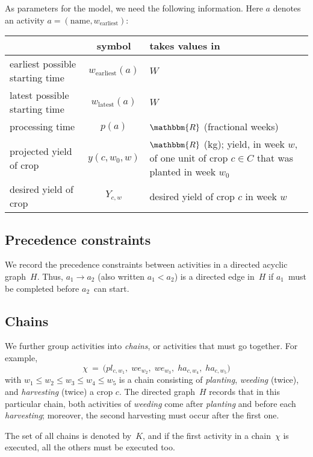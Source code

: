 \documentclass[11pt,reqno]{amsart}
\newcommand{\RR}{\mathbbm{R}}
\newcommand{\lra}{\longrightarrow}
\numberwithin{equation}{section}
\begin{document}
As parameters for the model, we need the following information. Here $a$ denotes an activity $a=(\text{name}, w_{\text{earliest}})$:
\begin{center}
  \begin{tabular}{lcp{8cm}}
    & symbol & takes values in\\\hline 
    earliest possible starting time & $w_{\text{earliest}}(a)$ & $W$ \\ 
    latest possible starting time & $w_{\text{latest}}(a)$ & $W$ \\ 
    processing time & $p(a)$ & $\RR$ (fractional weeks)\\ 
    projected yield of crop & $y(c,w_0,w)$ & $\RR$ (kg); yield, in week $w$, of one unit of crop $c\in C$ that was planted in week $w_0$\\
    desired yield of crop & $Y_{c,w}$ & desired yield of crop $c$ in week $w$\\\hline
  \end{tabular}
\end{center}

\subsection{Precedence constraints}

We record the precedence constraints between  activities in a directed acyclic
graph~$H$. Thus, $a_1\lra a_2$ (also written $a_1<a_2$) is a directed edge
in~$H$ if $a_1$~must be completed before $a_2$~can start. 

\subsection{Chains}
We further group activities into \emph{chains}, or activities that must go
together. For example,
\[
   \chi
   \ = \
   \big(pl_{c,w_1}, \;
    we_{w_2},\;
    we_{w_3},\;
    ha_{c,w_4},\;
    ha_{c,w_5}\big)
\]
with $w_1\le w_2\le w_3\le w_4\le w_5$ is a chain consisting of \emph{planting},
\emph{weeding} (twice), and \emph{harvesting} (twice) a crop $c$. The directed graph~$H$
records that in this particular chain, both activities of \emph{weeding} come after
\emph{planting} and before each \emph{harvesting}; moreover, the second harvesting must
occur after the first one. 

The set of all chains is denoted by~$K$, and if the first activity in a chain~$\chi$ is
executed, all the others must be executed too.
\end{document}
